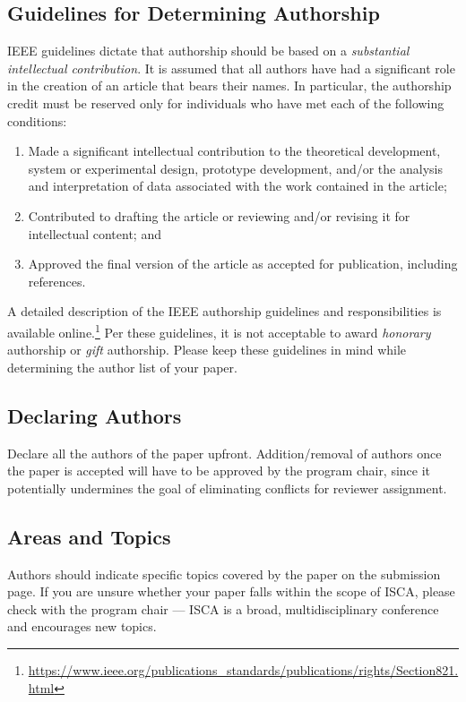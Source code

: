 \documentclass[conference]{IEEEtran}
\begin{document}
\subsection{Guidelines for Determining Authorship}
IEEE guidelines dictate that authorship should be based on a {\em
  substantial intellectual contribution}. It is assumed that all
authors have had a significant role in the creation of an article that
bears their names. In particular, the authorship credit must be
reserved only for individuals who have met each of the following
conditions: 

\begin{enumerate}
\item Made a significant intellectual contribution to the theoretical
  development, system or experimental design, prototype development,
  and/or the analysis and interpretation of data associated with the
  work contained in the article; 

\item Contributed to drafting the article or reviewing and/or revising
  it for intellectual content; and 

\item Approved the final version of the article as accepted for publication, including references.
\end{enumerate}

A detailed description of the IEEE authorship guidelines and
responsibilities is available online.\footnote{\url{https://www.ieee.org/publications_standards/publications/rights/Section821.html}} Per
these guidelines, it is not acceptable to award {\em honorary}
authorship or {\em gift} authorship. Please keep these guidelines in
mind while determining the author list of your paper. 

\subsection{Declaring Authors}
Declare all the authors of the paper upfront. Addition/removal of
authors once the paper is accepted will have to be approved by the
program chair, since it potentially undermines the goal of eliminating
conflicts for reviewer assignment. 

\subsection{Areas and Topics}
Authors should indicate specific topics covered by the paper on the
submission page. If you are unsure whether your paper falls within the
scope of ISCA, please check with the program chair --- ISCA is a broad,
multidisciplinary conference and encourages new topics. 
\end{document}
